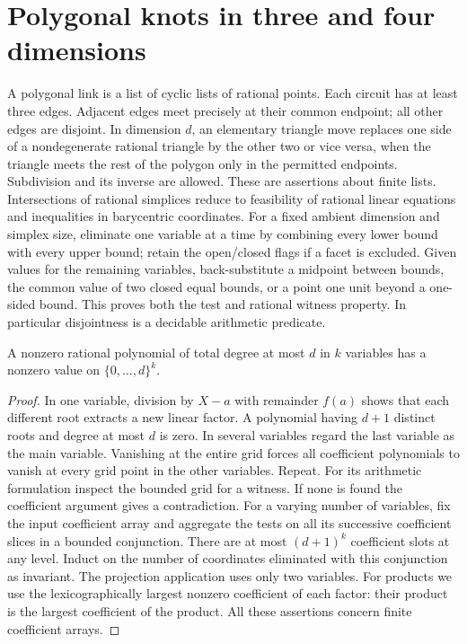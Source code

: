 \section{Polygonal knots in three and four dimensions}
\label{sec:geometry}
A polygonal link is a list of cyclic lists of rational points. Each circuit has at least three edges. Adjacent edges meet precisely at their common endpoint; all other edges are disjoint. In dimension $d$, an elementary triangle move replaces one side of a nondegenerate rational triangle by the other two or vice versa, when the triangle meets the rest of the polygon only in the permitted endpoints. Subdivision and its inverse are allowed. These are assertions about finite lists. Intersections of rational simplices reduce to feasibility of rational linear equations and inequalities in barycentric coordinates. For a fixed ambient dimension and simplex size, eliminate one variable at a time by combining every lower bound with every upper bound; retain the open/closed flags if a facet is excluded. Given values for the remaining variables, back-substitute a midpoint between bounds, the common value of two closed equal bounds, or a point one unit beyond a one-sided bound. This proves both the test and rational witness property. In particular disjointness is a decidable arithmetic predicate.

\begin{lemma}\label{lem:grid}
A nonzero rational polynomial of total degree at most $d$ in $k$ variables has a nonzero value on $\{0,\ldots,d\}^k$.
\end{lemma}
\begin{proof}
In one variable, division by $X-a$ with remainder $f(a)$ shows that each different root extracts a new linear factor. A polynomial having $d+1$ distinct roots and degree at most $d$ is zero. In several variables regard the last variable as the main variable. Vanishing at the entire grid forces all coefficient polynomials to vanish at every grid point in the other variables. Repeat. For its arithmetic formulation inspect the bounded grid for a witness. If none is found the coefficient argument gives a contradiction. For a varying number of variables, fix the input coefficient array and aggregate the tests on all its successive coefficient slices in a bounded conjunction. There are at most $(d+1)^k$ coefficient slots at any level. Induct on the number of coordinates eliminated with this conjunction as invariant. The projection application uses only two variables. For products we use the lexicographically largest nonzero coefficient of each factor: their product is the largest coefficient of the product. All these assertions concern finite coefficient arrays.
\end{proof}

